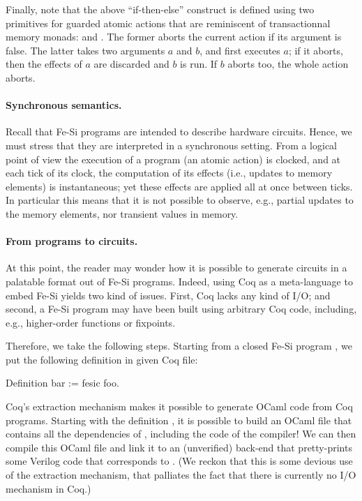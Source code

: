 \documentclass[preprint]{sigplanconf}
\begin{document}
Finally, note that the above ``if-then-else'' construct is defined
using two primitives for guarded atomic actions that are reminiscent
of transactionnal memory monads:  and . The
former aborts the current action if its argument is false. 
%
The latter takes two arguments $a$ and $b$, and first executes $a$; if
it aborts, then the effects of $a$ are discarded and $b$ is run. If
$b$ aborts too, the whole action  aborts.

\paragraph{Synchronous semantics.} Recall that Fe-Si programs are
intended to describe hardware circuits. Hence, we must stress that
they are interpreted in a synchronous setting.
%
From a logical point of view the execution of a program (an atomic
action) is clocked, and at each tick of its clock, the computation of
its effects (i.e., updates to memory elements) is instantaneous; 
yet these effects are applied all at once between ticks. 
%
In particular this means that it is not possible to observe, e.g.,
partial updates to the memory elements, nor transient values in
memory.

\paragraph{From programs to circuits.} At this point, the reader may
wonder how it is possible to generate circuits in a palatable format
out of Fe-Si programs. Indeed, using Coq as a meta-language to embed
Fe-Si yields two kind of issues. First, Coq lacks any kind of I/O; and
second, a Fe-Si program may have been built using arbitrary Coq code,
including, e.g., higher-order functions or fixpoints.

Therefore, we take the following steps.  Starting from a closed Fe-Si
program , we put the following definition in given Coq file:
\begin{coq}
Definition bar := fesic foo.  
\end{coq}
Coq's extraction mechanism makes it possible to generate OCaml code
from Coq programs. Starting with the definition , it is
possible to build an OCaml file that contains all the dependencies of
, including the code of the  compiler!
%
We can then compile this OCaml file and link it to an (unverified)
back-end that pretty-prints some Verilog code that corresponds to
.
%
(We reckon that this is some devious use of the extraction mechanism,
that palliates the fact that there is currently no I/O mechanism in
Coq.)
\end{document}
